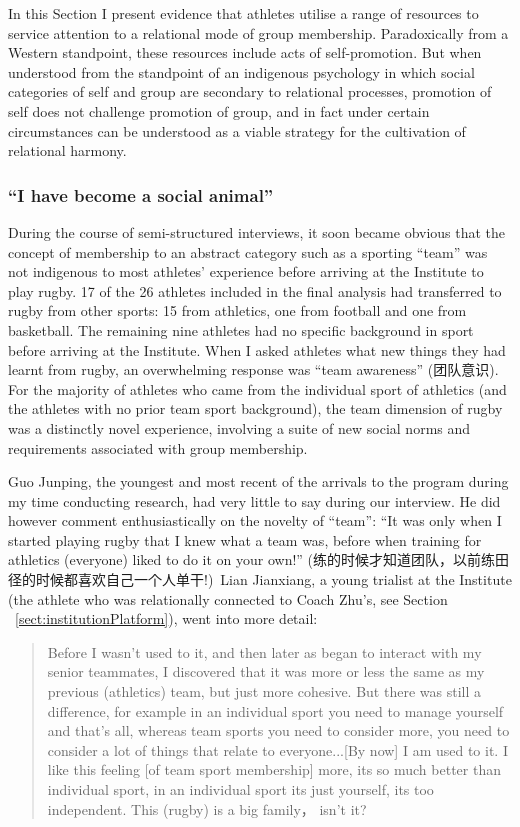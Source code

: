 \begin{CJK}{UTF8}{gbsn}
In this Section I present evidence that athletes utilise a range of resources to service attention to a relational mode of group membership.  Paradoxically from a Western standpoint, these resources include acts of self-promotion.  But when understood from the standpoint of an indigenous psychology in which social categories of self and group are secondary to relational processes, promotion of self does not challenge promotion of group, and in fact under certain circumstances can be understood as a viable strategy for the cultivation of relational harmony.



  \subsubsection{``I have become a social animal''\label{sect:socialAnimal}}

During the course of semi-structured interviews, it soon became obvious that the concept of membership to an abstract category such as a sporting ``team'' was not indigenous to most athletes' experience before arriving at the Institute to play rugby.  17 of the 26 athletes included in the final analysis had transferred to rugby from other sports: 15 from athletics, one from football and one from basketball.  The remaining nine athletes had no specific background in sport before arriving at the Institute.  When I asked athletes what new things they had learnt from rugby, an overwhelming response was ``team awareness'' (团队意识).  For the majority of athletes who came from the individual sport of athletics (and the athletes with no prior team sport background), the team dimension of rugby was a distinctly novel experience, involving a suite of new social norms and requirements associated with group membership.

Guo Junping, the youngest and most recent of the arrivals to the program during my time conducting research, had very little to say during our interview. He did however comment enthusiastically on the novelty of ``team'': ``It was only when I started playing rugby that I knew what a team was, before when training for athletics (everyone) liked to do it on your own!'' (练的时候才知道团队，以前练田径的时候都喜欢自己一个人单干!) Lian Jianxiang, a young trialist at the Institute (the athlete who was relationally connected to Coach Zhu's, see Section ~\ref{sect:institutionPlatform}), went into more detail:

    \begin{quotation}
     Before I wasn’t used to it, and then later as began to interact with my senior teammates, I discovered that it was more or less the same as my previous (athletics) team, but just more cohesive.  But there was still a difference, for example in an individual sport you need to manage yourself and that's all, whereas team sports you need to consider more, you need to consider a lot of things that relate to everyone...[By now] I am used to it. I like this feeling [of team sport membership] more, its so much better than individual sport, in an individual sport its just yourself, its too independent. This (rugby) is a big family， isn’t it?
    \end{quotation}


\end{CJK}
